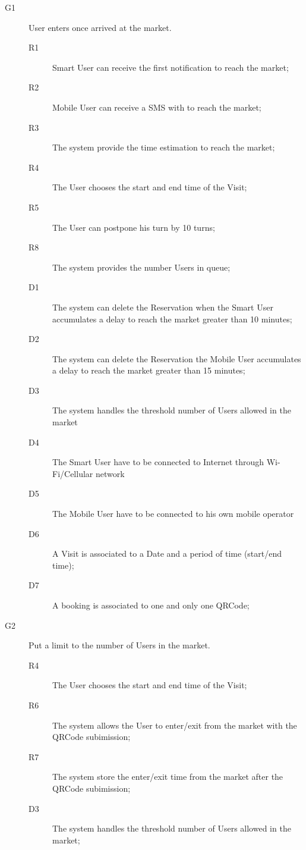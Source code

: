 \begin{description}
    \item[G1]User enters once arrived at the market.
    
    \begin{description}
    \item[R1] Smart User can receive the first notification to reach the market; 
    \item[R2] Mobile User can receive a SMS with  to reach the market;   %
    \item[R3] The system provide the time estimation to reach the market;
    \item[R4] The User chooses the start and end time of the Visit;
    \item[R5] The User can postpone his turn by 10 turns;
    \item[R8] The system provides the number Users in queue; %
    \item[D1] The system can delete the Reservation when the Smart User accumulates a delay to reach the market greater than 10 minutes; 
    \item[D2] The system can delete the Reservation the Mobile User accumulates a delay to reach the market greater than 15 minutes; 
    \item[D3] The system handles the threshold number of Users allowed in the market
    \item[D4] The Smart User have to be connected to Internet through Wi-Fi/Cellular network
    \item[D5] The Mobile User have to be connected to his own mobile operator
    \item[D6] A Visit is associated to a Date and a period of time (start/end time); 
    \item[D7] A booking is associated to one and only one QRCode;  
    \end{description}
    
    \item[G2]Put a limit to the number of Users in the market.
    
    \begin{description}
    \item[R4] The User chooses the start and end time of the Visit;
    \item[R6] The system allows the User to enter/exit from the market with the QRCode subimission; 
    \item[R7] The system store the enter/exit time from the market after the QRCode subimission; 
    \item[D3] The system handles the threshold number of Users allowed in the market;
    \end{description}
    

\end{description}

